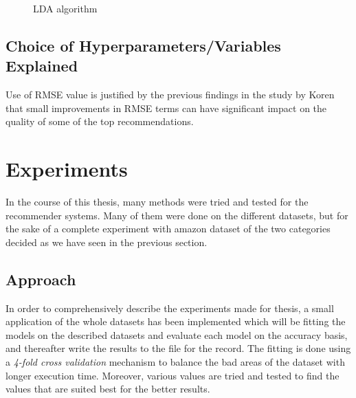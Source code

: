 \begin{figure}[H]
  {\par}
  \caption{LDA algorithm}
\end{figure}


\subsection{Choice of Hyperparameters/Variables Explained}

Use of RMSE value is justified by the previous findings in the study by Koren \cite{Koren2010} \cite{Koren2008} that small improvements in RMSE terms can have significant impact on the quality of some of the top recommendations.

\section{Experiments}
In the course of this thesis, many methods were tried and tested for the recommender systems. Many of them were done on the different datasets, but for the sake of a complete experiment with amazon dataset of the two categories decided as we have seen in the previous section.

\subsection{Approach}
In order to comprehensively describe the experiments made for thesis, a small application of the whole datasets has been implemented which will be fitting the models on the described datasets and evaluate each model on the accuracy basis, and thereafter write the results to the file for the record. The fitting is done using a \textit{4-fold cross validation} mechanism to balance the bad areas of the dataset with longer execution time. Moreover, various values are tried and tested to find the values that are suited best for the better results. 


